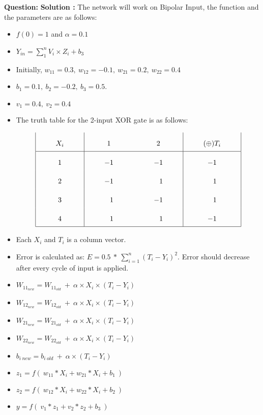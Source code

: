 \documentclass[12pt]{article}
\begin{document}
\textbf{Question: } 
\BlankLine	
\textbf{Solution :} The network will work on Bipolar Input, the function and the parameters are as follows:
\BlankLine
\begin{itemize}
	\item $ f(0) = 1 $ and $ \alpha =  0.1 $
	\item $ Y_{in} = \displaystyle \sum_{1}^{n} V_i \times Z_i + b_3$
	\item Initially, $w_{11} = 0.3, \ w_{12} = -0.1, \ w_{21} = 0.2,\  w_{22} = 0.4$  
	\item $b_1 = 0.1,\ b_2 = -0.2, \ b_3 = 0.5$.
	\item $v_1 = 0.4, \ v_2 = 0.4$
	
	\item The truth table for the 2-input XOR gate is as follows:

		\[\arraycolsep=1cm\def\arraystretch{2.2}
		\begin{array}{|c|c c|c|}
			X_i & 1 & 2 & (\oplus) T_i\\
			\hline 
			1 & -1 & -1 & -1\\
			2 & -1 & \phantom{-}1 &  \phantom{-}1\\ 
			3 & \phantom{-}1 & -1 & \phantom{-} 1\\
			4 & \phantom{-}1 &  \phantom{-}1 & -1\\
			\hline
		\end{array}\]
	
	\item Each $X_i$ and $T_i$ is a column vector.
	
	\item Error is calculated as: $ E = 0.5 \ * \ \displaystyle \sum_{i=1}^{n} (T_i - Y_i)^{2} $. Error should decrease after every cycle of input is applied.
	
	\item $W_{11_{new}} = W_{11_{old}}\ +\ \alpha \times X_i \times (T_i - Y_i)$  
	\item $W_{12_{new}} = W_{12_{old}}\ +\ \alpha \times X_i \times (T_i - Y_i)$  
	\item $W_{21_{new}} = W_{21_{old}}\ +\ \alpha \times X_i \times (T_i - Y_{i})$  
	\item $W_{22_{new}} = W_{22_{old}}\ +\ \alpha \times X_i \times (T_i - Y_{i})$  
	\item $b_{i\ new} = b_{i \ old}\ +\ \alpha \times (T_i - Y_{i})$  
	
	\item $z_1 = f(\ w_{11} * X_i + w_{21} * X_i + b_1\ )$
	\item $z_2 = f(\ w_{12} * X_i + w_{22} * X_i + b_2\ )$

	\item $y = f(\ v_1 * z_1 + v_2 * z_2 + b_3\ )$
		
\end{itemize}
\end{document}
